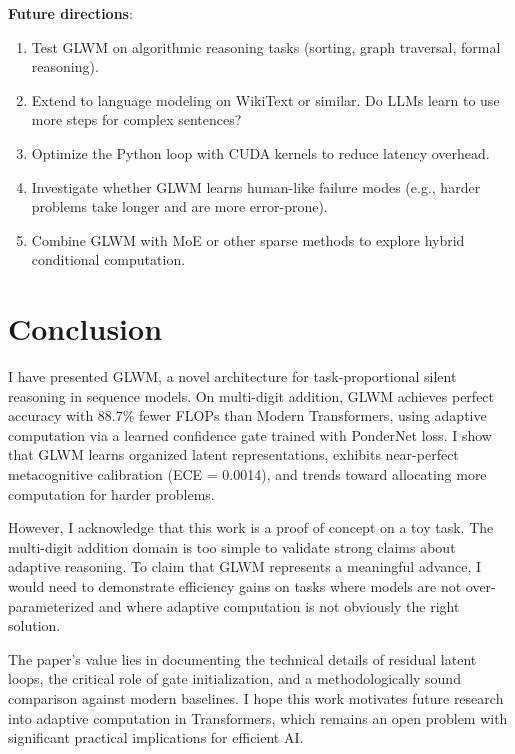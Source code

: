 \documentclass[11pt]{article}
\begin{document}
\textbf{Future directions}:

\begin{enumerate}
    \item Test GLWM on algorithmic reasoning tasks (sorting, graph traversal, formal reasoning).
    \item Extend to language modeling on WikiText or similar. Do LLMs learn to use more steps for complex sentences?
    \item Optimize the Python loop with CUDA kernels to reduce latency overhead.
    \item Investigate whether GLWM learns human-like failure modes (e.g., harder problems take longer and are more error-prone).
    \item Combine GLWM with MoE or other sparse methods to explore hybrid conditional computation.
\end{enumerate}

\section{Conclusion}

I have presented GLWM, a novel architecture for task-proportional silent reasoning in sequence models. On multi-digit addition, GLWM achieves perfect accuracy with 88.7\% fewer FLOPs than Modern Transformers, using adaptive computation via a learned confidence gate trained with PonderNet loss. I show that GLWM learns organized latent representations, exhibits near-perfect metacognitive calibration (ECE = 0.0014), and trends toward allocating more computation for harder problems.

However, I acknowledge that this work is a proof of concept on a toy task. The multi-digit addition domain is too simple to validate strong claims about adaptive reasoning. To claim that GLWM represents a meaningful advance, I would need to demonstrate efficiency gains on tasks where models are not over-parameterized and where adaptive computation is not obviously the right solution.

The paper's value lies in documenting the technical details of residual latent loops, the critical role of gate initialization, and a methodologically sound comparison against modern baselines. I hope this work motivates future research into adaptive computation in Transformers, which remains an open problem with significant practical implications for efficient AI.
\end{document}

